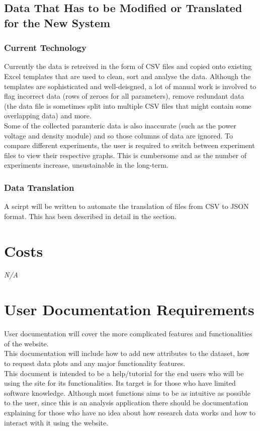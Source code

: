 \documentclass[12pt]{article}
\begin{document}
\subsection{Data That Has to be Modified or Translated for the New System}
\subsubsection{Current Technology}
Currently the data is retreived in the form of CSV files and copied onto existing Excel templates that are used to clean, sort and analyse 
the data. Although the templates are sophisticated and well-deisgned, a lot of manual work is involved to flag incorrect data (rows of zeroes for 
all parameters), remove redundant data (the data file is sometimes split into multiple CSV files that might contain some overlapping data) and more.\\
\newline
Some of the collected paramteric data is also inaccurate (such as the power voltage and density module) and so those columns of data are ignored.
To compare different experiments, the user is required to switch between experiment files to view their respective graphs. This is cumbersome and as 
the number of experiments increase, unsustainable in the long-term.

\subsubsection{Data Translation}
A scirpt will be written to automate the translation of files from CSV to JSON format. This has been described in detail in the  section.

\section{Costs}
\emph{N/A}
\section{User Documentation Requirements}
User documentation will cover the more complicated features and functionalities of the website.\\

\noindent This documentation will include how to add new attributes to the dataset, how
to request data plots and any major functionality features.\\ \newline
This document is intended to be a help/tutorial for the end users who will be
using the site for its functionalities. Its target is for those who have limited
software knowledge. Although most functions aims to be as intuitive as possible
to the user, since this is an analysis application there should be documentation
explaining for those who have no idea about how research data works and how to
interact with it using the website.
\end{document}
